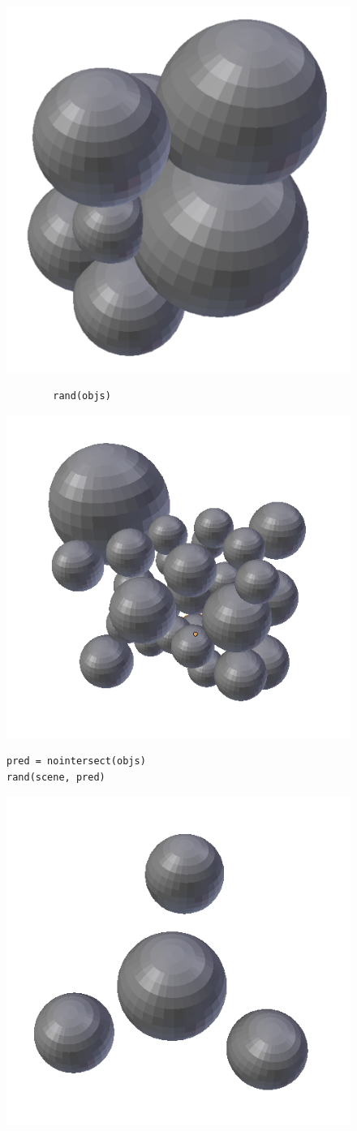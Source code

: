 \begin{figure}[h]
\centering
\begin{minipage}[t]{5cm}
\centering
\includegraphics[width=0.5\linewidth]{figures/clunk}
\begin{verbatim}
        rand(objs)
\end{verbatim}
\end{minipage}%
\begin{minipage}[t]{5cm}
\centering
\includegraphics[width=0.8\linewidth]{figures/render}
\begin{verbatim}
pred = nointersect(objs)
rand(scene, pred)
\end{verbatim}
\end{minipage}%
\begin{minipage}[t]{5cm}
\centering
\includegraphics[width=0.5\linewidth]{figures/equi}

\end{minipage}
\end{figure}
